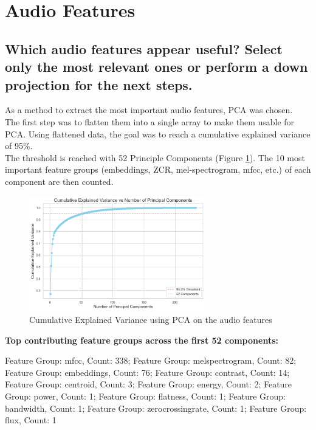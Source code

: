 
\section{Audio Features}
\label{sec:Audio Features}

\subsection{Which audio features appear useful? Select only the most relevant ones or perform a down projection for the next steps.}
\label{sec:Audio Features:a}

As a method to extract the most important audio features, PCA was chosen. \\
The first step was to flatten them into a single array to make them usable for PCA. Using flattened data, the goal was to reach a cumulative explained variance of 95\%. \\
The threshold is reached with 52 Principle Components (Figure \ref{fig:Cumulative Explained Variance}).  The 10 most important feature groups (embeddings, ZCR, mel-spectrogram, mfcc, etc.) of each component are then counted. 

\begin{figure}[htbp]
    \centering
    \includegraphics[width=0.5\linewidth, height=5cm]{figs/Cumulative Explained Variance.png}
    \caption{Cumulative Explained Variance using PCA on the audio features}
    \label{fig:Cumulative Explained Variance}
\end{figure}

\textbf{Top contributing feature groups across the first 52 components:}

Feature Group: mfcc, Count: 338;
Feature Group: melspectrogram, Count: 82;
Feature Group: embeddings, Count: 76;
Feature Group: contrast, Count: 14;
Feature Group: centroid, Count: 3;
Feature Group: energy, Count: 2;
Feature Group: power, Count: 1;
Feature Group: flatness, Count: 1;
Feature Group: bandwidth, Count: 1;
Feature Group: zerocrossingrate, Count: 1;
Feature Group: flux, Count: 1

